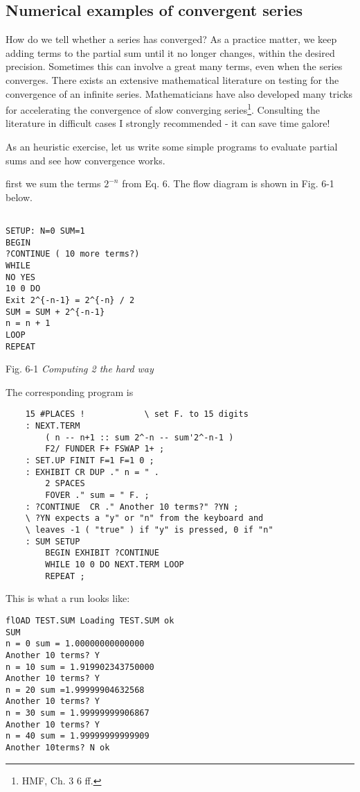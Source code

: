 \subsection{Numerical examples of convergent series}
How do we tell whether a series has converged? As a practice matter, we keep adding terms to the partial sum until it no longer changes, within the desired precision. Sometimes this can involve a great many terms, even when the series converges. There exists an extensive mathematical literature on testing for the convergence of an infinite series. Mathematicians have also developed many tricks for accelerating the convergence of slow converging series\footnote{HMF, Ch. 3 6 ff.}. Consulting the literature in difficult cases I strongly recommended - it can save time galore!

As an heuristic exercise, let us write some simple programs to evaluate partial sums and see how convergence works.

first we sum the terms $2^{-n}$ from Eq. 6. The flow diagram is shown in Fig. 6-1 below.

\begin{lstlisting}

SETUP: N=0 SUM=1
BEGIN
?CONTINUE ( 10 more terms?)
WHILE
NO YES
10 0 DO
Exit 2^{-n-1} = 2^{-n} / 2
SUM = SUM + 2^{-n-1}
n = n + 1
LOOP
REPEAT
\end{lstlisting}

Fig. 6-1 \textit{Computing 2 the hard way}

The corresponding program is

\begin{lstlisting}
    15 #PLACES !            \ set F. to 15 digits
    : NEXT.TERM
        ( n -- n+1 :: sum 2^-n -- sum'2^-n-1 )
        F2/ FUNDER F+ FSWAP 1+ ;
    : SET.UP FINIT F=1 F=1 0 ;
    : EXHIBIT CR DUP ." n = " .
        2 SPACES
        FOVER ." sum = " F. ;
    : ?CONTINUE  CR ." Another 10 terms?" ?YN ;
    \ ?YN expects a "y" or "n" from the keyboard and
    \ leaves -1 ( "true" ) if "y" is pressed, 0 if "n"
    : SUM SETUP
        BEGIN EXHIBIT ?CONTINUE
        WHILE 10 0 DO NEXT.TERM LOOP
        REPEAT ;
\end{lstlisting}

This is what a run looks like:

\begin{lstlisting}
flOAD TEST.SUM Loading TEST.SUM ok
SUM
n = 0 sum = 1.00000000000000
Another 10 terms? Y
n = 10 sum = 1.919902343750000
Another 10 terms? Y
n = 20 sum =1.99999904632568
Another 10 terms? Y
n = 30 sum = 1.99999999906867
Another 10 terms? Y
n = 40 sum = 1.99999999999909
Another 10terms? N ok
\end{lstlisting}


